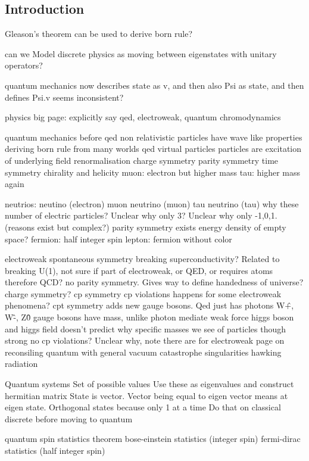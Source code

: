 
\subsection{Introduction}

Gleason's theorem
	can be used to derive born rule?

can we Model discrete physics as moving between eigenstates with unitary operators?

quantum mechanics now describes state as v, and then also Psi as state, and then defines Psi.v seems inconsistent?

physics
	big page: explicitly say qed, electroweak, quantum chromodynamics

	quantum mechanics
		before qed
		non relativistic
		particles have wave like properties
		deriving born rule from many worlds
	qed
		virtual particles
		particles are excitation of underlying field
		renormalisation
		charge symmetry
		parity symmetry
		time symmetry
		chirality and helicity
		muon: electron but higher mass
		tau: higher mass again

		neutrios:
			neutino (electron)
			muon neutrino (muon)
			tau neutrino (tau)
		why these number of electric particles? Unclear
		why only 3? Unclear
		why only -1,0,1. (reasons exist but complex?)
		parity symmetry exists
		energy density of empty space?
	fermion: half integer spin
	lepton: fermion without color

	electroweak
		spontaneous symmetry breaking
		superconductivity? Related to breaking U(1), not sure if part of electroweak, or QED, or requires atoms therefore QCD?
		no parity symmetry. Gives way to define handedness of universe?
		charge symmetry?
		cp symmetry
		cp violations happens for some electroweak phenomena?
		cpt symmetry
		adds new gauge bosons. Qed just has photons
		W\^+, W\^-, Z\^0 gauge bosons
			have mass, unlike photon
			mediate weak force
		higgs boson and higgs field
			doesn't predict why specific masses we see of particles though
	strong
		no cp violations? Unclear why, note there are for electroweak
	page on reconsiling quantum with general
		vacuum catastrophe
		singularities
		hawking radiation

Quantum systems
Set of possible values
Use these as eigenvalues and construct hermitian matrix
State is vector. Vector being equal to eigen vector means at eigen state. Orthogonal states because only 1 at a time
Do that on classical discrete before moving to quantum

quantum
spin statistics theorem
bose-einstein statistics (integer spin)
fermi-dirac statistics (half integer spin)

